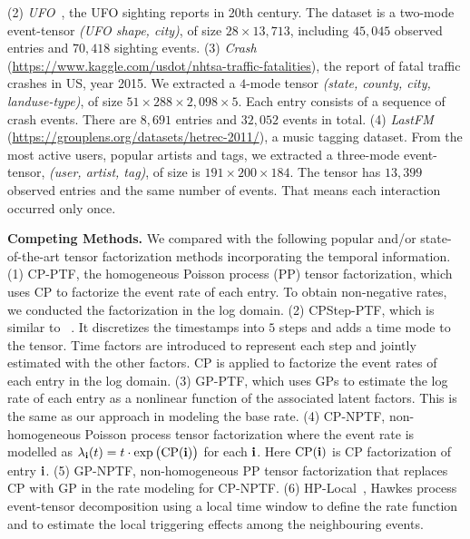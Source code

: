    (2) \textit{UFO}~\citep{zhe2018stochastic}, the UFO sighting reports in 20th century. The dataset is a two-mode event-tensor \textit{(UFO shape, city)}, of size $28  \times 13,713$, including $45,045$ observed entries and $70,418$ sighting events. (3) \textit{Crash} (\url{https://www.kaggle.com/usdot/nhtsa-traffic-fatalities}), the report of fatal traffic crashes in US, year 2015. We extracted a $4$-mode tensor \textit{(state, county, city, landuse-type)}, of size $51 \times 288 \times 2,098 \times 5$. 
Each entry consists of a sequence of crash events. There are $8,691$ entries and $32,052$ events in total.  (4) \textit{LastFM} (\url{https://grouplens.org/datasets/hetrec-2011/}), a music tagging dataset. From the most active users, popular artists and tags, we extracted a three-mode event-tensor, \textit{(user, artist, tag)}, of size is $191 \times 200 \times 184$. The tensor has $13,399$ observed entries and the same number of events. That means each interaction occurred only once.  

\textbf{Competing Methods.}  We compared with the following popular and/or state-of-the-art tensor factorization methods incorporating the temporal information. 
(1) CP-PTF, the homogeneous Poisson process (PP) tensor factorization, which uses CP to factorize the event rate of each entry.  To obtain non-negative rates, we conducted the factorization in the log domain. (2) CPStep-PTF, which is similar to ~\citep{schein2015bayesian}. It discretizes the timestamps into $5$ steps and adds a time mode to the tensor. Time factors are introduced to represent each step and jointly estimated with the other factors. CP is applied to factorize the event rates of each entry in the log domain. (3) GP-PTF, which uses GPs to estimate the log rate of each entry as a nonlinear function of the associated latent factors. This is the same as our approach in modeling the base rate. (4) CP-NPTF, non-homogeneous Poisson process tensor factorization where the event rate is modelled as $\lambda_{{\bf i}}(t) =t\cdot  \exp\big(\mathrm{CP({\bf i})}\big) $ for each ${\bf i}$. Here $\mathrm{CP}({\bf i})$ is CP factorization of entry ${\bf i}$. (5) GP-NPTF, non-homogeneous PP tensor factorization that replaces CP with GP in the rate modeling for CP-NPTF. (6) HP-Local~\citep{zhe2018stochastic}, Hawkes process event-tensor decomposition using a local time window to define the rate function and to estimate the local triggering effects among the neighbouring events.

